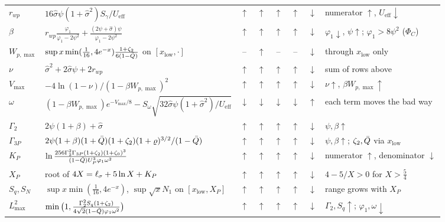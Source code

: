 \begin{table}
\begin{ruledtabular}
\begin{tabular}{p{}p{}ccccc p{}}
$r_{wp}$ & $16\hat\sigma\psi(1+\hat\sigma^2)S_\gamma/U_{\mathrm{eff}}$ & $\uparrow$ & $\uparrow$ & $\uparrow$ & $\uparrow$ & $\downarrow$ & numerator $\uparrow$, $U_{\mathrm{eff}}\downarrow$\\
$\beta$ & $r_{wp}\frac{\varphi_1}{\varphi_1-2\psi^2}+\frac{(2\psi+\hat\sigma)\psi}{\varphi_1-2\psi^2}$ & $\uparrow$ & $\uparrow$ & $\uparrow$ & $\uparrow$ & $\downarrow$ & $\varphi_1\downarrow$, $\psi\uparrow$; $\varphi_1>8\psi^2$ ($\Phi_C$)\\
$W_{p,\max}$ & $\sup x\min(\tfrac1{16},4e^{-x})\frac{1+\zeta_2}{6(1-\bar Q)}$ on $[x_{\mathrm{low}},\cdot]$ & -- & $\uparrow$ & -- & -- & $\downarrow$ & through $x_{\mathrm{low}}$ only\\
$\nu$ & $\hat\sigma^2+2\hat\sigma\psi+2r_{wp}$ & $\uparrow$ & $\uparrow$ & $\uparrow$ & $\uparrow$ & $\downarrow$ & sum of rows above\\
$V_{\max}$ & $-4\ln(1-\nu)/(1-\beta W_{p,\max})^2$ & $\uparrow$ & $\uparrow$ & $\uparrow$ & $\uparrow$ & $\downarrow$ & $\nu\uparrow$, $\beta W_{p,\max}\uparrow$\\
$\omega$ & $(1-\beta W_{p,\max})e^{-V_{\max}/8}-S_\omega\sqrt{32\hat\sigma\psi(1+\hat\sigma^2)/U_{\mathrm{eff}}}$ & $\downarrow$ & $\downarrow$ & $\downarrow$ & $\downarrow$ & $\uparrow$ & each term moves the bad way\\
$\Gamma_2$ & $2\psi(1+\beta)+\hat\sigma$ & $\uparrow$ & $\uparrow$ & $\uparrow$ & $\uparrow$ & $\downarrow$ & $\psi,\beta\uparrow$\\
$\Gamma_{3P}$ & $2\psi(1+\beta)(1+\bar Q)(1+\zeta_2)(1+\varrho)^{3/2}/(1-\bar Q)$ & $\uparrow$ & $\uparrow$ & $\uparrow$ & $\uparrow$ & $\downarrow$ & $\psi,\beta\uparrow$; $\zeta_2,\bar Q$ via $x_{\mathrm{low}}$\\
$K_P$ & $\ln\frac{256\Gamma_2^2\Gamma_{3P}(1+\zeta_2)(1+\zeta_0)^3}{(1-\bar Q)U_P^3\varphi_1\omega^2}$ & $\uparrow$ & $\uparrow$ & $\uparrow$ & $\uparrow$ & $\downarrow$ & numerator $\uparrow$, denominator $\downarrow$\\
$X_P$ & root of $4X=\ell_\sigma+5\ln X+K_P$ & $\uparrow$ & $\uparrow$ & $\uparrow$ & $\uparrow$ & $\downarrow$ & $4-5/X>0$ for $X>\frac54$\\
$S_q,S_N$ & $\sup x\min(\frac1{16},4e^{-x})$, $\sup\sqrt xN_1$ on $[x_{\mathrm{low}},X_P]$ & $\uparrow$ & $\uparrow$ & $\uparrow$ & $\uparrow$ & $\downarrow$ & range grows with $X_P$\\
$L^2_{\max}$ & $\min\big(1,\frac{\Gamma_2^2S_q(1+\zeta_2)}{4\sqrt2(1-\bar Q)\varphi_1\omega^2}\big)$ & $\uparrow$ & $\uparrow$ & $\uparrow$ & $\uparrow$ & $\downarrow$ & $\Gamma_2,S_q\uparrow$; $\varphi_1,\omega\downarrow$\\

\end{tabular}
\end{ruledtabular}
\end{table}
